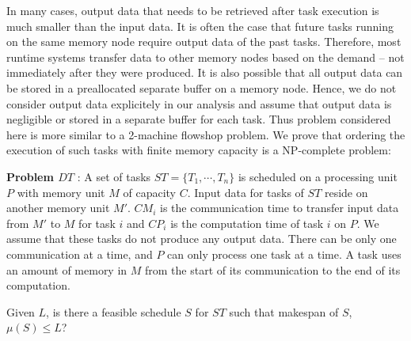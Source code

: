 \documentclass[runningheads]{llncs} %
\begin{document}
In many cases, output data that needs to be retrieved after task execution is much smaller than the input data. It is often the case that future tasks running on the same memory node require output data of the past tasks. Therefore, most runtime systems transfer data to other memory nodes based on the demand -- not immediately after they were produced. It is also possible that all output data can be stored in a preallocated separate buffer on a memory node. Hence, we do not consider output data explicitely in our analysis and assume that output data is negligible or stored in a separate buffer for each task. Thus problem considered here is more similar to a 2-machine flowshop problem. We prove that ordering the execution of such tasks with finite memory capacity is a NP-complete problem: %


\noindent\textbf{Problem $DT$} : A set of tasks $ST=\{T_1,
\cdots, T_n\}$ is scheduled on a processing unit $P$ with
memory unit $M$ of capacity $C$. Input data for tasks of $ST$
reside on another memory unit $M'$. $CM_i$ is the communication time to
transfer input data from $M'$ to $M$ for task $i$ and $CP_i$
is the computation time of task $i$ on $P$. We assume that these
tasks do not produce any output data. There can be only one
communication at a time, and $P$ can only process one task at
a time. A task uses an amount of memory in  $M$ from the
start of its communication to the end of its computation.

\noindent Given $L$, is there a feasible schedule $S$ for $ST$ such that
makespan of $S$, $\mu(S) \le L$?
\end{document}
